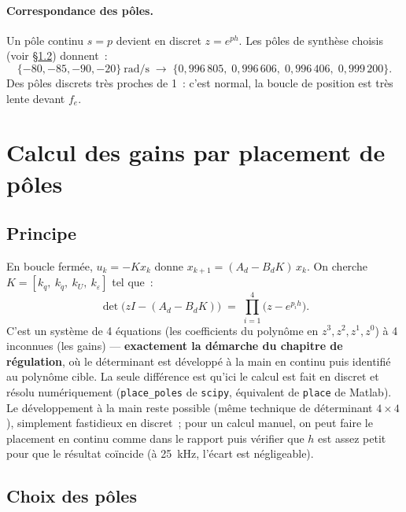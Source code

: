 \documentclass[a4paper,11pt]{article}
\begin{document}
\paragraph{Correspondance des pôles.}
Un pôle continu $s = p$ devient en discret $z = e^{p h}$. Les pôles de
synthèse choisis (voir §\ref{subsec:choixpoles}) donnent~:
\begin{equation}
    \{-80, -85, -90, -20\}\ \text{rad/s}
    \;\longrightarrow\;
    \{0{,}996\,805,\; 0{,}996\,606,\; 0{,}996\,406,\; 0{,}999\,200\}.
\end{equation}
Des pôles discrets très proches de 1~: c'est normal, la boucle de position est
très lente devant $f_e$.

\section{Calcul des gains par placement de pôles}
\label{sec:placement}

\subsection{Principe}

En boucle fermée, $u_k = -K x_k$ donne $x_{k+1} = (A_d - B_d K)\,x_k$. On
cherche $K = [k_q,\ k_{\dot q},\ k_U,\ k_\varepsilon]$ tel que~:
\begin{equation}
    \det\big(z I - (A_d - B_d K)\big)
    \;=\; \prod_{i=1}^{4} \big(z - e^{p_i h}\big).
    \label{eq:place}
\end{equation}
C'est un système de 4 équations (les coefficients du polynôme en $z^3, z^2,
z^1, z^0$) à 4 inconnues (les gains) --- \textbf{exactement la démarche du
chapitre de régulation}, où le déterminant est développé à la main en continu
puis identifié au polynôme cible. La seule différence est qu'ici le calcul est
fait en discret et résolu numériquement (\texttt{place\_poles} de
\texttt{scipy}, équivalent de \texttt{place} de Matlab). Le développement à la
main reste possible (même technique de déterminant $4\times4$), simplement
fastidieux en discret~; pour un calcul manuel, on peut faire le placement en
continu comme dans le rapport puis vérifier que $h$ est assez petit pour que
le résultat coïncide (à 25~kHz, l'écart est négligeable).

\subsection{Choix des pôles}
\label{subsec:choixpoles}
\end{document}
